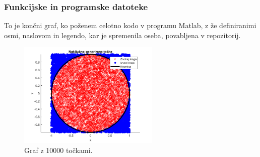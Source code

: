 \documentclass{beamer}
\begin{document}
\begin{frame}
\frametitle{Funkcijske in programske datoteke}
\justifying
To je končni graf, ko poženem celotno kodo v programu Matlab, z že definiranimi osmi, naslovom in legendo, kar je spremenila oseba, povabljena v repozitorij. 
\begin{figure}
    \centering
    \includegraphics[width=0.6\textwidth]{graf.png}
    \caption{Graf z 10000 točkami.}
\end{figure}


\end{frame}
\end{document}
